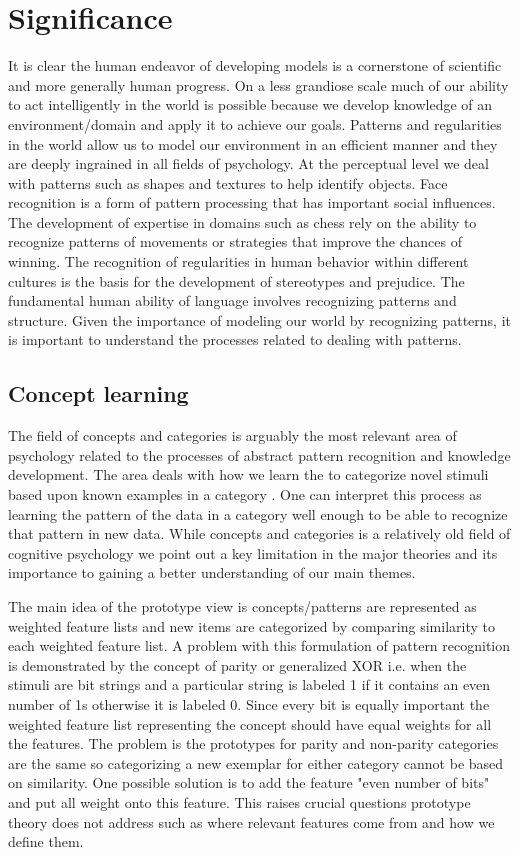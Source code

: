 \documentclass[doc]{apa}%
\begin{document}
\section{Significance}
    It is clear the human endeavor of developing models is a cornerstone of scientific and more generally human progress.  On a less grandiose scale much of our ability to act intelligently in the world is possible because we develop knowledge of an environment/domain and apply it to achieve our goals.  Patterns and regularities in the world allow us to model our environment in an efficient manner and they are deeply ingrained in all fields of psychology.  At the perceptual level we deal with patterns such as shapes and textures to help identify objects.  Face recognition is a form of pattern processing that has important social influences.  The development of expertise in domains such as chess rely on the ability to recognize patterns of movements or strategies that improve the chances of winning.  The recognition of regularities in human behavior within different cultures is the basis for the development of stereotypes and prejudice.  The fundamental human ability of language involves recognizing patterns and structure.  Given the importance of modeling our world by recognizing patterns, it is important to understand the processes related to dealing with patterns.

\subsection{Concept learning}
The field of concepts and categories is arguably the most relevant area
of psychology related to the processes of abstract pattern recognition
and knowledge development.  The area deals with how we learn the to
categorize novel stimuli based upon known examples in a category \cite{bbc}.  One can interpret this process as learning the pattern of the data in a category well enough to be able to recognize that pattern in new data.  While concepts and categories is a relatively old field of cognitive psychology we point out a key limitation in the major theories and its importance to gaining a better understanding of our main themes.

The main idea of the prototype view is concepts/patterns are
represented as weighted feature lists and new items are categorized by
comparing similarity to each weighted feature list.  A
problem with this formulation of pattern recognition is demonstrated
by the concept of parity or generalized XOR i.e. when the stimuli are
bit strings and a particular string is labeled 1 if it contains an
even number of 1s otherwise it is labeled 0.  Since every bit is
equally important the weighted feature list representing the concept
should have equal weights for all the features.  The problem is the
prototypes for parity and non-parity categories are the same so
categorizing a new exemplar for either category cannot be based on
similarity.  One possible solution is to add the feature "even number
of bits" and put all weight onto this feature.  This raises crucial
questions prototype theory does not address such as where relevant features come from and how we define them. 
\end{document}
